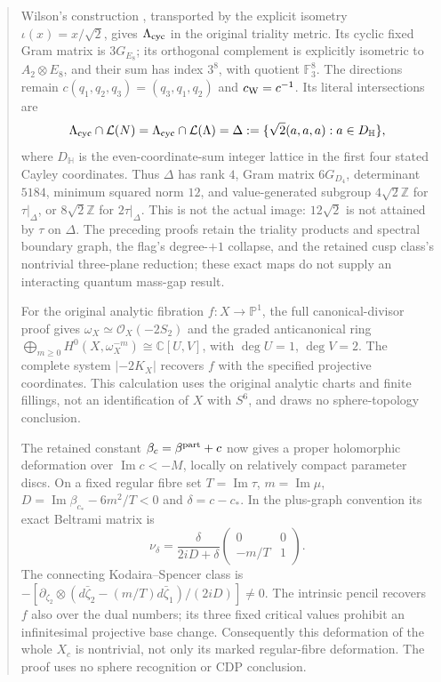 \documentclass[11pt,letterpaper]{article}
\theoremstyle{definition}
\theoremstyle{remark}
\begin{document}
\begin{abstract}
Wilson's construction \cite{esn:Wilson2009}, transported by the explicit
isometry $\iota(x)=x/\sqrt2$, gives $\Lambda_{\rm cyc}$ in the
original triality metric. Its cyclic fixed Gram matrix is $3G_{E_8}$;
its orthogonal complement is explicitly isometric to $A_2\otimes E_8$,
and their sum has index $3^8$, with quotient $\mathbb F_3^8$.
The directions remain $c(q_1,q_2,q_3)=(q_3,q_1,q_2)$ and
$c_{\rm W}=c^{-1}$. Its literal intersections are
\[
 \Lambda_{\rm cyc}\cap\mathcal L(N)
 =\Lambda_{\rm cyc}\cap\mathcal L(\Lambda)
 =\Delta:=\{\sqrt2(a,a,a):a\in D_{\mathbb H}\},
\]
where $D_{\mathbb H}$ is the even-coordinate-sum integer lattice in
the first four stated Cayley coordinates. Thus $\Delta$ has rank $4$,
Gram matrix $6G_{D_4}$, determinant $5184$, minimum squared norm $12$,
and value-generated subgroup $4\sqrt2\mathbb Z$ for $\tau|_\Delta$, or
$8\sqrt2\mathbb Z$ for $2\tau|_\Delta$. This is not the actual image:
$12\sqrt2$ is not attained by $\tau$ on $\Delta$.
The preceding proofs retain the triality products and spectral boundary
graph, the flag's degree-$+1$ collapse, and the retained cusp class's
nontrivial three-plane reduction; these exact maps do not supply an
interacting quantum mass-gap result.

For the original analytic fibration $f:X\to\mathbb P^1$, the full
canonical-divisor proof gives
$\omega_X\simeq\mathcal O_X(-2S_2)$ and the graded anticanonical ring
$\bigoplus_{m\ge0}H^0(X,\omega_X^{-m})\cong\mathbb C[U,V]$,
with $\deg U=1$, $\deg V=2$. The complete system $|-2K_X|$
recovers $f$ with the specified projective coordinates. This calculation
uses the original analytic charts and finite fillings, not an
identification of $X$ with $S^6$, and draws no sphere-topology conclusion.

The retained constant $\beta_c=\beta^{\rm part}+c$ now gives a proper
holomorphic deformation over $\operatorname{Im}c<-M$, locally on
relatively compact parameter discs. On a fixed regular fibre set
$T=\operatorname{Im}\tau$, $m=\operatorname{Im}\mu$,
$D=\operatorname{Im}\beta_{c_*}-6m^2/T<0$ and $\delta=c-c_*$.
In the plus-graph convention its exact Beltrami matrix is
\[
 \nu_\delta=\frac{\delta}{2iD+\delta}
                 \begin{pmatrix}0&0\\-m/T&1\end{pmatrix}.
\]
The connecting Kodaira--Spencer class is
$-[\partial_{\zeta_2}\otimes
(d\bar\zeta_2-(m/T)d\bar\zeta_1)/(2iD)]\ne0$.
The intrinsic pencil recovers $f$ also over the dual numbers; its three
fixed critical values prohibit an infinitesimal projective base change.
Consequently this deformation of the whole $X_c$ is nontrivial,
not only its marked regular-fibre deformation. The proof uses no sphere
recognition or CDP conclusion.




\end{abstract}
\end{document}
